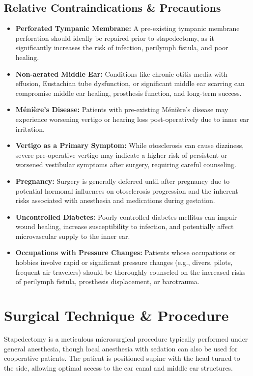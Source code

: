 \subsection*{Relative Contraindications \& Precautions}
\begin{itemize}
  \item \textbf{Perforated Tympanic Membrane:} A pre-existing tympanic membrane perforation should ideally be repaired prior to stapedectomy, as it significantly increases the risk of infection, perilymph fistula, and poor healing.
  
  \item \textbf{Non-aerated Middle Ear:} Conditions like chronic otitis media with effusion, Eustachian tube dysfunction, or significant middle ear scarring can compromise middle ear healing, prosthesis function, and long-term success.
  
  \item \textbf{Méni\`{e}re's Disease:} Patients with pre-existing Méni\`{e}re's disease may experience worsening vertigo or hearing loss post-operatively due to inner ear irritation.
  
  \item \textbf{Vertigo as a Primary Symptom:} While otosclerosis can cause dizziness, severe pre-operative vertigo may indicate a higher risk of persistent or worsened vestibular symptoms after surgery, requiring careful counseling.
  
  \item \textbf{Pregnancy:} Surgery is generally deferred until after pregnancy due to potential hormonal influences on otosclerosis progression and the inherent risks associated with anesthesia and medications during gestation.
  
  \item \textbf{Uncontrolled Diabetes:} Poorly controlled diabetes mellitus can impair wound healing, increase susceptibility to infection, and potentially affect microvascular supply to the inner ear.
  
  \item \textbf{Occupations with Pressure Changes:} Patients whose occupations or hobbies involve rapid or significant pressure changes (e.g., divers, pilots, frequent air travelers) should be thoroughly counseled on the increased risks of perilymph fistula, prosthesis displacement, or barotrauma.
\end{itemize}

\section*{Surgical Technique \& Procedure}
Stapedectomy is a meticulous microsurgical procedure typically performed under general anesthesia, though local anesthesia with sedation can also be used for cooperative patients. The patient is positioned supine with the head turned to the side, allowing optimal access to the ear canal and middle ear structures.


